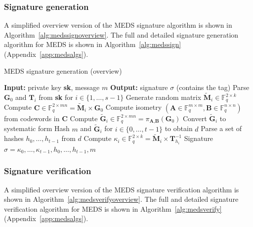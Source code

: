 \documentclass[11pt,a4paper]{report}
\theoremstyle{definition}
\begin{document}
\subsubsection{Signature generation}
A simplified overview version of the MEDS signature algorithm is shown in Algorithm~\ref{alg:medssignoverview}. The full and detailed signature generation algorithm for MEDS is shown in Algorithm~\ref{alg:medssign} (Appendix~\ref{app:medsalgs}).

\begin{algorithm}
  \caption{MEDS signature generation (overview)}
  \label{alg:medssignoverview}
  \begin{algorithmic}[1]
    \State \textbf{Input:} private key \textbf{sk}, message $m$
    \State \textbf{Output:} signature $\sigma$ (contains the tag)
    \State Parse $\textbf{G}_0$ and $\textbf{T}_i$ from \textbf{sk} for $i \in \{1, \ldots, s - 1\}$
    \State Generate random matrix $\tilde{\textbf{M}}_i \in \mathbb{F}_q^{2 \times k}$
    \State Compute $\textbf{C} \in \mathbb{F}_q^{2 \times mn} = \tilde{\textbf{M}}_i \times \textbf{G}_0$
    \State Compute isometry $(\textbf{A} \in \mathbb{F}_q^{m \times m}, \textbf{B} \in \mathbb{F}_q^{n \times n})$ from codewords in $\textbf{C}$
    \State Compute $\tilde{\textbf{G}}_i \in \mathbb{F}_q^{2 \times mn} = \pi_{\textbf{A}, \textbf{B}}(\textbf{G}_0)$
    \State Convert $\tilde{\textbf{G}}_i$ to systematic form
    \EndFor
    \State Hash $m$ and $\tilde{\textbf{G}}_i$ for $i \in \{0, \ldots, t - 1\}$ to obtain $d$
    \State Parse a set of hashes $h_0, \ldots, h_{t-1}$ from $d$
    \State Compute $\kappa_i \in \mathbb{F}_q^{2 \times k} = \tilde{\textbf{M}}_i \times \textbf{T}^{-1}_{h_i}$
    \EndIf
    \EndFor
    \State \Return Signature $\sigma = \kappa_0, \ldots, \kappa_{t-1}, h_0, \ldots, h_{t-1}, m$
  \end{algorithmic}
\end{algorithm}

\subsubsection{Signature verification}
A simplified overview version of the MEDS signature verification algorithm is shown in Algorithm~\ref{alg:medsverifyoverview}. The full and detailed signature verification algorithm for MEDS is shown in Algorithm~\ref{alg:medsverify} (Appendix~\ref{app:medsalgs}).
\end{document}
